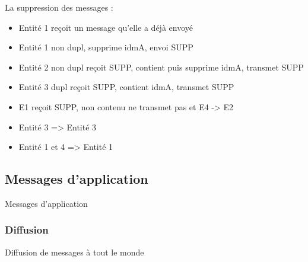 \documentclass{beamer}
\begin{document}
\begin{frame}{La suppression des messages :}
	\begin{itemize}
		\item<1-7> Entité 1 reçoit un message qu'elle a déjà envoyé
		\item<2-7> Entité 1 non dupl, supprime idmA, envoi SUPP
		\item<3-7> Entité 2 non dupl reçoit SUPP, contient puis supprime idmA, transmet SUPP
		\item<4-7> Entité 3 dupl reçoit SUPP, contient idmA, transmet SUPP
		\item<5-7> E1 reçoit SUPP, non contenu ne transmet pas et E4 -> E2
		\item<6-7> Entité 3 => Entité 3 
		\item<7-7> Entité 1 et 4 => Entité 1
	\end{itemize}
\end{frame}

\subsection{Messages d'application}
\begin{frame}
	\begin{center}
		{\Huge Messages d'application}
	\end{center}
\end{frame}

\subsubsection{Diffusion}
\begin{frame}
	\begin{center}
		{\Huge Diffusion de messages à tout le monde}
	\end{center}
\end{frame}
\end{document}
